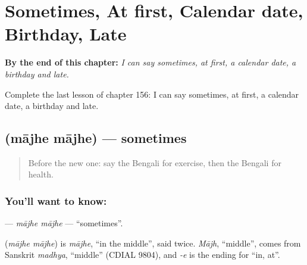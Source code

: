 
\chapter{Sometimes, At first, Calendar date, Birthday, Late}
\label{ch:bn-sometimes-at-first-calendar-date-birthday-late}

\begin{chapteropening}
\textbf{By the end of this chapter:} \emph{I can say sometimes, at first, a calendar date, a birthday and late.}

Complete the last lesson of chapter 156: I can say sometimes, at first, a calendar date, a birthday and late.
\end{chapteropening}

\section[\texorpdfstring{\bn{মাঝে} \bn{মাঝে} (mājhe mājhe)}{মাঝে মাঝে (mājhe mājhe)}]{  (mājhe mājhe) — sometimes}

\label{lesson:BN-C156-majhe-majhe}



\begin{quote}
Before the new one: say the Bengali for exercise, then the Bengali for health.
\end{quote}

\subsection*{You'll want to know:  }
\textbf{ } — \emph{mājhe mājhe} — \textquotedblleft{}sometimes\textquotedblright{}.

\begin{cousinweb}
\textbf{ } (\emph{mājhe mājhe}) is \emph{mājhe}, \textquotedblleft{}in the middle\textquotedblright{}, said twice. \emph{Mājh}, \textquotedblleft{}middle\textquotedblright{}, comes from Sanskrit \emph{madhya}, \textquotedblleft{}middle\textquotedblright{} (CDIAL 9804), and \emph{-e} is the ending for \textquotedblleft{}in, at\textquotedblright{}.
\end{cousinweb}


